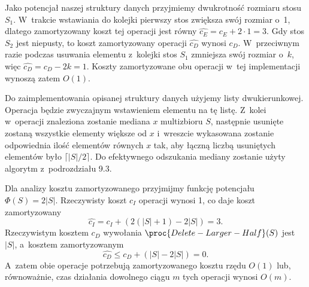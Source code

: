Jako potencjał naszej struktury danych przyjmiemy dwukrotność rozmiaru stosu $S_1$.
W~trakcie wstawiania do kolejki pierwszy stos zwiększa swój rozmiar o~1, dlatego zamortyzowany koszt tej operacji jest równy $\widehat{c_E}=c_E+2\cdot1=3$.
Gdy stos $S_2$ jest niepusty, to koszt zamortyzowany operacji  $\widehat{c_D}$ wynosi $c_D$.
W~przeciwnym razie podczas usuwania elementu z~kolejki stos $S_1$ zmniejsza swój rozmiar o~$k$, więc $\widehat{c_D}=c_D-2k=1$.
Koszty zamortyzowane obu operacji w~tej implementacji wynoszą zatem $O(1)$.

\exercise %

\noindent Do zaimplementowania opisanej struktury danych użyjemy listy dwukierunkowej.
Operacja  będzie zwyczajnym wstawieniem elementu na tę listę.
Z~kolei w~operacji  znaleziona zostanie mediana $x$ multizbioru $S$, następnie usunięte zostaną wszystkie elementy większe od $x$ i~wreszcie wykasowana zostanie odpowiednia ilość elementów równych $x$ tak, aby łączną liczbą usuniętych elementów było $\lceil|S|/2\rceil$.
Do efektywnego odszukania mediany zostanie użyty algorytm  z~podrozdziału 9.3.

Dla analizy kosztu zamortyzowanego przyjmijmy funkcję potencjału $\Phi(S)=2|S|$.
Rzeczywisty koszt $c_I$ operacji  wynosi 1, co daje koszt zamortyzowany
\[
	\widehat{c_I} = c_I+(2(|S|+1)-2|S|) = 3.
\]
Rzeczywistym kosztem $c_D$ wywołania $\proc{Delete-Larger-Half}(S)$ jest $|S|$, a~kosztem zamortyzowanym
\[
	\widehat{c_D} \le c_D+(|S|-2|S|) = 0.
\]
A~zatem obie operacje potrzebują zamortyzowanego kosztu rzędu $O(1)$ lub, równoważnie, czas działania dowolnego ciągu $m$ tych operacji wynosi $O(m)$.
